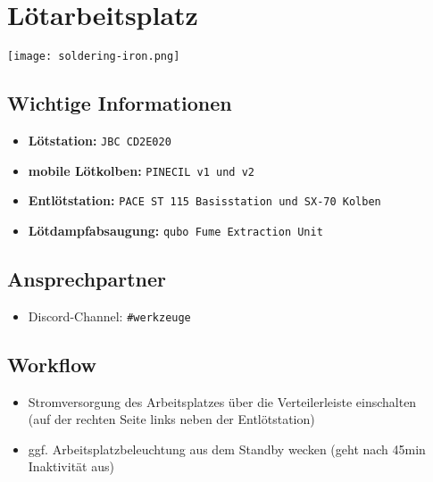 \documentclass[a5paper]{article}
\begin{document}
	
	\noindent
	\begin{minipage}{0.25\textwidth}
		\section*{Lötarbeitsplatz}
	\end{minipage}
	\hfill
	\begin{minipage}{0.1\textwidth}
		\texttt{[image: soldering-iron.png]}	
	\end{minipage}
	\hspace{1em}
	\begin{minipage}{0.1\textwidth}
				
	\end{minipage}%
	
	\subsection*{Wichtige Informationen}
	\begin{itemize}
		\item \textbf{Lötstation:} \texttt{JBC CD2E020}
		\item \textbf{mobile Lötkolben:} \texttt{PINECIL v1 und v2}
		\item \textbf{Entlötstation:} \texttt{PACE ST 115 Basisstation und SX-70 Kolben}
		\item \textbf{Lötdampfabsaugung:} \texttt{qubo Fume Extraction Unit}
	\end{itemize}
	
	\noindent\dotfill
	\subsection*{Ansprechpartner}
	\begin{itemize}
		\item Discord-Channel: \colorbox{gray!30}{\texttt{\#werkzeuge}}
	\end{itemize}
	
	\noindent\dotfill
	\subsection*{Workflow}
	\begin{itemize}
	    \item Stromversorgung des Arbeitsplatzes über die Verteilerleiste einschalten\\ (auf der rechten Seite links neben der Entlötstation)
	    \item ggf. Arbeitsplatzbeleuchtung aus dem Standby wecken (geht nach 45min Inaktivität aus)
	\end{itemize}
	
\end{document}
